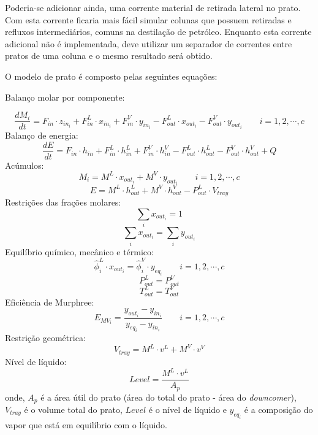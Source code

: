 Poderia-se adicionar ainda, uma corrente material de retirada lateral no prato. Com esta corrente ficaria mais fácil
simular colunas que possuem retiradas e refluxos intermediários, comuns na destilação de petróleo. Enquanto esta
corrente adicional não é implementada, deve utilizar um separador de correntes entre pratos de uma coluna e o mesmo
resultado será obtido.

O modelo de prato é composto pelas seguintes equações:
\begin{flushleft}
Balanço molar por componente:
\end{flushleft}
\begin{equation}
\dfrac{dM_i}{dt} = F_{in} \cdot z_{in_i} + F_{in}^L \cdot x_{in_i} + F_{in}^V \cdot y_{in_i} - F_{out}^L  \cdot x_{out_i} -
F_{out}^V \cdot y_{out_i}  \qquad i=1,2,\cdots,c
\end{equation}
Balanço de energia:
\begin{equation}
\dfrac{dE}{dt} = F_{in} \cdot h_{in} + F_{in}^L \cdot h_{in}^L + F_{in}^V \cdot h_{in}^V - F_{out}^L  \cdot h_{out}^L -
F_{out}^V \cdot h_{out}^V + Q
\end{equation}
Acúmulos:
\begin{equation}
M_i = M^L \cdot x_{out_i} + M^V \cdot y_{out_i}  \qquad i=1,2,\cdots,c
\end{equation}
\begin{equation}
E = M^L \cdot h_{out}^L + M^V \cdot h_{out}^V - P_{out}^L \cdot V_{tray}
\end{equation}
Restrições das frações molares:
\begin{equation}
\sum_i x_{out_i} = 1
\end{equation}
\begin{equation}
\sum_i x_{out_i} = \sum_i y_{out_i}
\end{equation}
Equilíbrio químico, mecânico e térmico:
\begin{equation}
\hat{\phi}_i^L \cdot x_{out_i} = \hat{\phi}_i^V \cdot y_{eq_i}  \qquad
i=1,2,\cdots,c
\end{equation}
\begin{equation}
P_{out}^L = P_{out}^V
\end{equation}
\begin{equation}
T_{out}^L = T_{out}^V
\end{equation}
Eficiência de Murphree:
\begin{equation}
E_{MV_i} = \dfrac{ y_{out_i} - y_{in_i} } {y_{eq_i} - y_{in_i} } \qquad i=1,2,\cdots,c
\end{equation}
Restrição geométrica:
\begin{equation}
V_{tray} = M^L \cdot v^L + M^V \cdot v^V
\end{equation}
Nível de líquido:
\begin{equation}
Level = \dfrac {M^L \cdot v^L}{A_p}
\end{equation}
onde, $A_p$ é a área útil do prato (área do total do prato - área do
\textit{downcomer}), $V_{tray}$ é o volume total do prato, $Level$ é o nível de
líquido e $y_{eq_i}$ é a composição do vapor que está em equilíbrio com o líquido.

